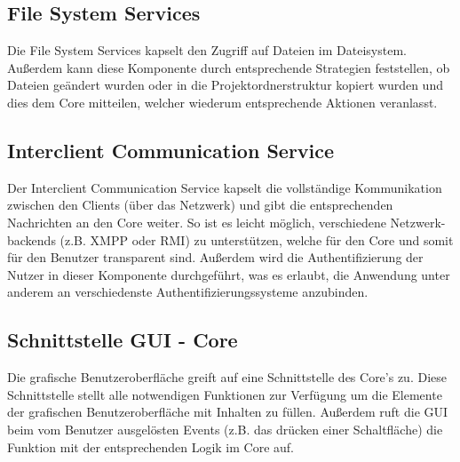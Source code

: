 \subsection{File System Services}
Die File System Services kapselt den Zugriff auf Dateien im Dateisystem. Außerdem kann diese Komponente durch entsprechende Strategien feststellen, ob Dateien geändert wurden oder in die Projektordnerstruktur kopiert wurden und dies dem Core mitteilen, welcher wiederum entsprechende Aktionen veranlasst.

\subsection{Interclient Communication Service} 
Der Interclient Communication Service kapselt die vollständige Kommunikation zwischen den Clients (über das Netzwerk) und gibt die entsprechenden Nachrichten an den Core weiter. So ist es leicht möglich, verschiedene Netzwerk-backends (z.B. XMPP oder RMI) zu unterstützen, welche für den Core und somit für den Benutzer transparent sind. Außerdem wird die Authentifizierung der Nutzer in dieser Komponente durchgeführt, was es erlaubt, die Anwendung unter anderem an verschiedenste Authentifizierungssysteme anzubinden. 

\subsection{Schnittstelle GUI - Core}
Die grafische Benutzeroberfläche greift auf eine Schnittstelle des Core's zu. Diese Schnittstelle stellt alle notwendigen Funktionen zur Verfügung um die Elemente der grafischen Benutzeroberfläche mit Inhalten zu füllen. Außerdem ruft die GUI beim vom Benutzer ausgelösten Events (z.B. das drücken einer Schaltfläche) die Funktion mit der entsprechenden Logik im Core auf. 

